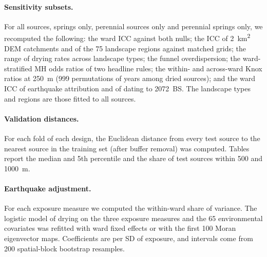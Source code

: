 \paragraph{Sensitivity subsets.} For all sources, springs only, perennial sources only and perennial springs only, we recomputed the following: the ward ICC against both nulls; the ICC of \SI{2}{\kilo\metre\squared} DEM catchments and of the 75 landscape regions against matched grids; the range of drying rates across landscape types; the funnel overdispersion; the ward-stratified MH odds ratios of two headline rules; the within- and across-ward Knox ratios at \SI{250}{\metre} (999 permutations of years among dried sources); and the ward ICC of earthquake attribution and of dating to 2072~BS. The landscape types and regions are those fitted to all sources.
\paragraph{Validation distances.} For each fold of each design, the Euclidean distance from every test source to the nearest source in the training set (after buffer removal) was computed. Tables report the median and 5th percentile and the share of test sources within 500 and \SI{1000}{\metre}.
\paragraph{Earthquake adjustment.} For each exposure measure we computed the within-ward share of variance. The logistic model of drying on the three exposure measures and the 65 environmental covariates was refitted with ward fixed effects or with the first 100 Moran eigenvector maps. Coefficients are per SD of exposure, and intervals come from 200 spatial-block bootstrap resamples.

\clearpage

